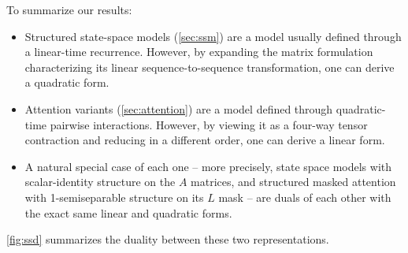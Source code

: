 To summarize our results:
\begin{itemize}
  \item Structured state-space models (\cref{sec:ssm}) are a model usually defined through a linear-time recurrence.
    However, by expanding the matrix formulation characterizing its linear sequence-to-sequence transformation, one can derive a quadratic form.
  \item Attention variants (\cref{sec:attention}) are a model defined through quadratic-time pairwise interactions. However, by viewing it as a four-way tensor contraction and reducing in a different order, one can derive a linear form.
  \item A natural special case of each one -- 
    more precisely, state space models with scalar-identity structure on the $A$ matrices, and structured masked attention with 1-semiseparable structure on its $L$ mask
    -- are duals of each other with the exact same linear and quadratic forms.
\end{itemize}
\cref{fig:ssd} summarizes the duality between these two representations.




